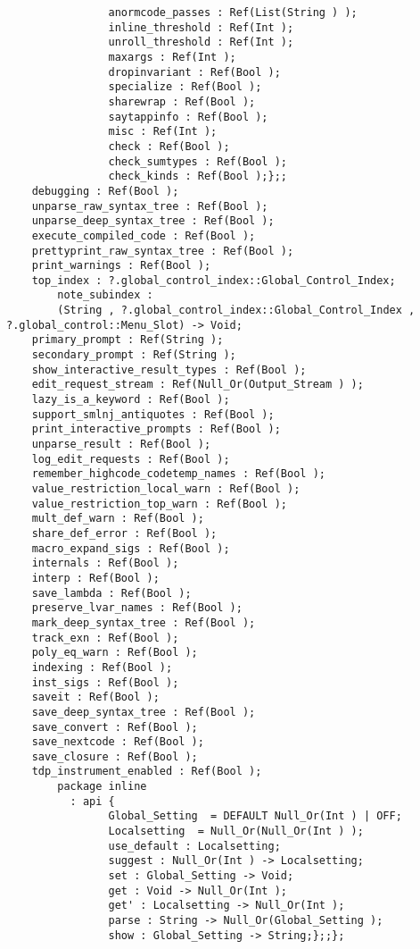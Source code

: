 \begin{verbatim}
                anormcode_passes : Ref(List(String ) );
                inline_threshold : Ref(Int );
                unroll_threshold : Ref(Int );
                maxargs : Ref(Int );
                dropinvariant : Ref(Bool );
                specialize : Ref(Bool );
                sharewrap : Ref(Bool );
                saytappinfo : Ref(Bool );
                misc : Ref(Int );
                check : Ref(Bool );
                check_sumtypes : Ref(Bool );
                check_kinds : Ref(Bool );};;
    debugging : Ref(Bool );
    unparse_raw_syntax_tree : Ref(Bool );
    unparse_deep_syntax_tree : Ref(Bool );
    execute_compiled_code : Ref(Bool );
    prettyprint_raw_syntax_tree : Ref(Bool );
    print_warnings : Ref(Bool );
    top_index : ?.global_control_index::Global_Control_Index;
        note_subindex :
        (String , ?.global_control_index::Global_Control_Index , ?.global_control::Menu_Slot) -> Void;
    primary_prompt : Ref(String );
    secondary_prompt : Ref(String );
    show_interactive_result_types : Ref(Bool );
    edit_request_stream : Ref(Null_Or(Output_Stream ) );
    lazy_is_a_keyword : Ref(Bool );
    support_smlnj_antiquotes : Ref(Bool );
    print_interactive_prompts : Ref(Bool );
    unparse_result : Ref(Bool );
    log_edit_requests : Ref(Bool );
    remember_highcode_codetemp_names : Ref(Bool );
    value_restriction_local_warn : Ref(Bool );
    value_restriction_top_warn : Ref(Bool );
    mult_def_warn : Ref(Bool );
    share_def_error : Ref(Bool );
    macro_expand_sigs : Ref(Bool );
    internals : Ref(Bool );
    interp : Ref(Bool );
    save_lambda : Ref(Bool );
    preserve_lvar_names : Ref(Bool );
    mark_deep_syntax_tree : Ref(Bool );
    track_exn : Ref(Bool );
    poly_eq_warn : Ref(Bool );
    indexing : Ref(Bool );
    inst_sigs : Ref(Bool );
    saveit : Ref(Bool );
    save_deep_syntax_tree : Ref(Bool );
    save_convert : Ref(Bool );
    save_nextcode : Ref(Bool );
    save_closure : Ref(Bool );
    tdp_instrument_enabled : Ref(Bool );
        package inline
          : api {
                Global_Setting  = DEFAULT Null_Or(Int ) | OFF;
                Localsetting  = Null_Or(Null_Or(Int ) );
                use_default : Localsetting;
                suggest : Null_Or(Int ) -> Localsetting;
                set : Global_Setting -> Void;
                get : Void -> Null_Or(Int );
                get' : Localsetting -> Null_Or(Int );
                parse : String -> Null_Or(Global_Setting );
                show : Global_Setting -> String;};;};
\end{verbatim}
